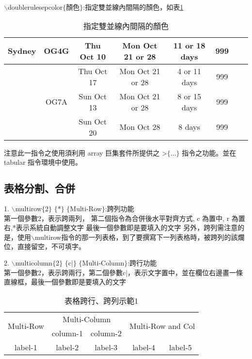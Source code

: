 $\backslash$doublerulesepcolor$\lbrace$顏色$\rbrace$:指定雙並線內間隔的顏色，如表\ref{e7}\\
\begin{table}[h]
\centering
\caption{指定雙並線內間隔的顏色}\label{e7}
\extrarowheight=3pt
\smallskip
\setlength{\extrarowheight}{2mm}
\setlength{\extrarowheight}{2mm}
\doublerulesep=4pt
\begin{tabular}{|l|c|c|c|c|c|c|c|}
\hline\hline
Sydney & OG4G &Thu Oct 10 &Mon Oct 21 or 28 &11 or 18 days &999\\\hline
& &Thu Oct 17 &Mon Oct 21 or 28 & 4 or 11 days &999\\\hline
&OG7A &Sun Oct 13 &Mon Oct 21 or 28 & 8 or 15 days &999\\\hline
& &Sun Oct 20 &Mon Oct 28 & 8 days &999\\
\hline\hline
\end{tabular}
\end{table}
\bigskip

注意此一指令之使用須利用 array 巨集套件所提供之 >$\lbrace$...$\rbrace$ 指令之功能。並在 tabular 指令環境中使用。


\subsection{表格分割、合併}
1. $\backslash$multirow$\lbrace$2$\rbrace$ $\lbrace$*$\rbrace$ $\lbrace$Multi-Row$\rbrace$:跨列功能\\
第一個參數2，表示跨兩列， 第二個指令為合併後水平對齊方式, c 為置中, r 為置右,*表示系統自動調整文字
最後一個參數即是要填入的文字
另外，跨列需注意的是，使用$\backslash$multirow指令的那一列表格，到了要撰寫下一列表格時，被跨列的該爛位，直接留空，不可填字。

2. $\backslash$multicolumn$\lbrace$2$\rbrace$ $\lbrace$c|$\rbrace$ $\lbrace$Multi-Column$\rbrace$:跨行功能\\
第一個參數2，表示跨兩行，第二個參數c|，表示文字置中，並在欄位右邊畫一條直線框，最後一個參數即是要填入的文字
\bigskip
\begin{table}[h]
\centering
\caption{表格跨行、跨列示範1}\label{e8}
\extrarowheight=3pt
\smallskip
\setlength{\extrarowheight}{2mm}
\begin{tabular}{|c|c|c|c|c|}
\hline
\multirow{2}{*}{Multi-Row} &
\multicolumn{2}{c|}{Multi-Column} &
\multicolumn{2}{c|}{\multirow{2}{*}{Multi-Row and Col}} \\
\cline{2-3}
  & column-1 & column-2 & \multicolumn{2}{c|}{} \\
\hline
label-1 & label-2 & label-3 & label-4 & label-5 \\
\hline
\end{tabular}
\end{table}
\bigskip

